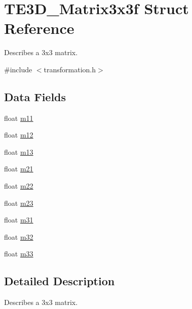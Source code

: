 \hypertarget{struct_t_e3_d___matrix3x3f}{\section{T\-E3\-D\-\_\-\-Matrix3x3f Struct Reference}
\label{struct_t_e3_d___matrix3x3f}
}


Describes a 3x3 matrix.  




{\ttfamily \#include $<$transformation.\-h$>$}

\subsection*{Data Fields}
\begin{DoxyCompactItemize}
\item 
float \hyperlink{struct_t_e3_d___matrix3x3f_a02c16113c6c4ce99349a1dc82bdc21cc}{m11}
\item 
float \hyperlink{struct_t_e3_d___matrix3x3f_aec316cfb9b53d085372bf0cd0c769af1}{m12}
\item 
float \hyperlink{struct_t_e3_d___matrix3x3f_ac7bf992102416f7ab7da5a4ef7341cb6}{m13}
\item 
float \hyperlink{struct_t_e3_d___matrix3x3f_a7f8222cebbd5007d7b56d367d0a6ab2a}{m21}
\item 
float \hyperlink{struct_t_e3_d___matrix3x3f_a3f6c71e06ae8d5e18af7c50f20b0acd6}{m22}
\item 
float \hyperlink{struct_t_e3_d___matrix3x3f_a777da9b73eb3d9a5ef1b5c2d54daf90e}{m23}
\item 
float \hyperlink{struct_t_e3_d___matrix3x3f_af66b0b91043ff95a9ef5af104b82a25b}{m31}
\item 
float \hyperlink{struct_t_e3_d___matrix3x3f_a94bf9c417b8241a4fea0783bd56c5466}{m32}
\item 
float \hyperlink{struct_t_e3_d___matrix3x3f_a869382309bd500b986d2449b9f3ff04d}{m33}
\end{DoxyCompactItemize}


\subsection{Detailed Description}
Describes a 3x3 matrix. 

